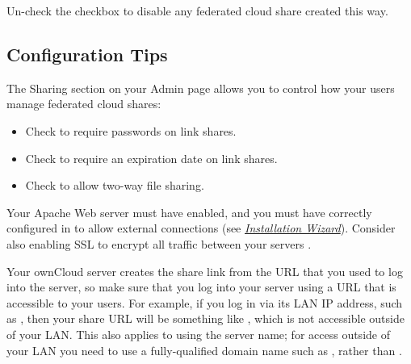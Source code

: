 \documentclass[letterpaper,10pt,english]{sphinxmanual}
\begin{document}
Un-check the  checkbox to disable any federated cloud share
created this way.


\subsection{Configuration Tips}
\label{configuration_files/federated_cloud_sharing_configuration:configuration-tips}
The Sharing section on your Admin page allows you to control how your users
manage federated cloud shares:
\begin{itemize}
\item {} 
Check  to require passwords on link shares.

\item {} 
Check  to require an expiration date on link
shares.

\item {} 
Check  to allow two-way file sharing.

\end{itemize}

Your Apache Web server must have  enabled, and you must have
 correctly configured in  to allow external
connections (see {\hyperref[installation/installation_wizard::doc]{\emph{Installation Wizard}}}). Consider also
enabling SSL to encrypt all traffic between your servers .

Your ownCloud server creates the share link from the URL that you used to log
into the server, so make sure that you log into your server using a URL that is
accessible to your users. For example, if you log in via its LAN IP address,
such as , then your share URL will be something like
, which is not
accessible outside of your LAN. This also applies to using the server name; for
access outside of your LAN you need to use a fully-qualified domain name such as
, rather than .
\end{document}
